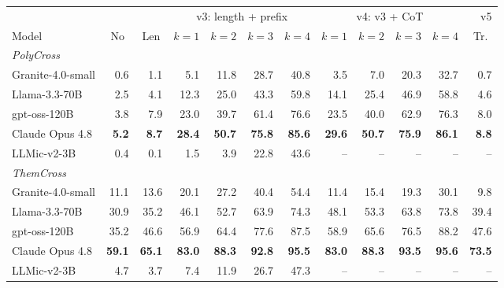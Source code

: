 \begin{tabular}{lrrrrrrrrrrr}
\toprule
 & \multicolumn{2}{c}{} & \multicolumn{4}{c}{v3: length + prefix} & \multicolumn{4}{c}{v4: v3 + CoT} & v5 \\
\cmidrule(lr){4-7}\cmidrule(lr){8-11}
Model & \multicolumn{1}{c}{No} & \multicolumn{1}{c}{Len} & $k{=}1$ & $k{=}2$ & $k{=}3$ & $k{=}4$ & $k{=}1$ & $k{=}2$ & $k{=}3$ & $k{=}4$ & \multicolumn{1}{c}{Tr.} \\
\midrule
\multicolumn{12}{l}{\textit{PolyCross}} \\
\quad Granite-4.0-small & 0.6 & 1.1 & 5.1 & 11.8 & 28.7 & 40.8 & 3.5 & 7.0 & 20.3 & 32.7 & 0.7 \\
\quad Llama-3.3-70B & 2.5 & 4.1 & 12.3 & 25.0 & 43.3 & 59.8 & 14.1 & 25.4 & 46.9 & 58.8 & 4.6 \\
\quad gpt-oss-120B & 3.8 & 7.9 & 23.0 & 39.7 & 61.4 & 76.6 & 23.5 & 40.0 & 62.9 & 76.3 & 8.0 \\
\quad Claude Opus 4.8 & \textbf{5.2} & \textbf{8.7} & \textbf{28.4} & \textbf{50.7} & \textbf{75.8} & \textbf{85.6} & \textbf{29.6} & \textbf{50.7} & \textbf{75.9} & \textbf{86.1} & \textbf{8.8} \\
\quad LLMic-v2-3B & 0.4 & 0.1 & 1.5 & 3.9 & 22.8 & 43.6 & -- & -- & -- & -- & -- \\
\midrule
\multicolumn{12}{l}{\textit{ThemCross}} \\
\quad Granite-4.0-small & 11.1 & 13.6 & 20.1 & 27.2 & 40.4 & 54.4 & 11.4 & 15.4 & 19.3 & 30.1 & 9.8 \\
\quad Llama-3.3-70B & 30.9 & 35.2 & 46.1 & 52.7 & 63.9 & 74.3 & 48.1 & 53.3 & 63.8 & 73.8 & 39.4 \\
\quad gpt-oss-120B & 35.2 & 46.6 & 56.9 & 64.4 & 77.6 & 87.5 & 58.9 & 65.6 & 76.5 & 88.2 & 47.6 \\
\quad Claude Opus 4.8 & \textbf{59.1} & \textbf{65.1} & \textbf{83.0} & \textbf{88.3} & \textbf{92.8} & \textbf{95.5} & \textbf{83.0} & \textbf{88.3} & \textbf{93.5} & \textbf{95.6} & \textbf{73.5} \\
\quad LLMic-v2-3B & 4.7 & 3.7 & 7.4 & 11.9 & 26.7 & 47.3 & -- & -- & -- & -- & -- \\
\bottomrule
\end{tabular}
